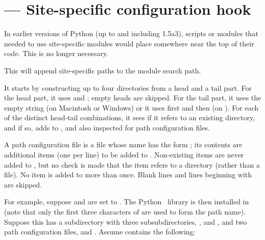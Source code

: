 \section{ ---
         Site-specific configuration hook}




In earlier versions of Python (up to and including 1.5a3), scripts or
modules that needed to use site-specific modules would place
 somewhere near the top of their code.  This is no
longer necessary.

This will append site-specific paths to the module search path.

It starts by constructing up to four directories from a head and a
tail part.  For the head part, it uses  and
; empty heads are skipped.  For
the tail part, it uses the empty string (on Macintosh or Windows) or
it uses first  and then
 (on \UNIX{}).  For each of the distinct
head-tail combinations, it sees if it refers to an existing directory,
and if so, adds to , and also inspected for path
configuration files.

A path configuration file is a file whose name has the form
; its contents are additional items (one
per line) to be added to .  Non-existing items are
never added to , but no check is made that the item
refers to a directory (rather than a file).  No item is added to
 more than once.  Blank lines and lines beginning with
\code{\#} are skipped.

For example, suppose  and  are
set to .  The Python \version\ library is then
installed in  (note that only the first 
three characters of  are used to form the path
name).  Suppose this has a subdirectory
 with three
subsubdirectories, ,  and , and two
path configuration files,  and .  Assume
 contains the following:

